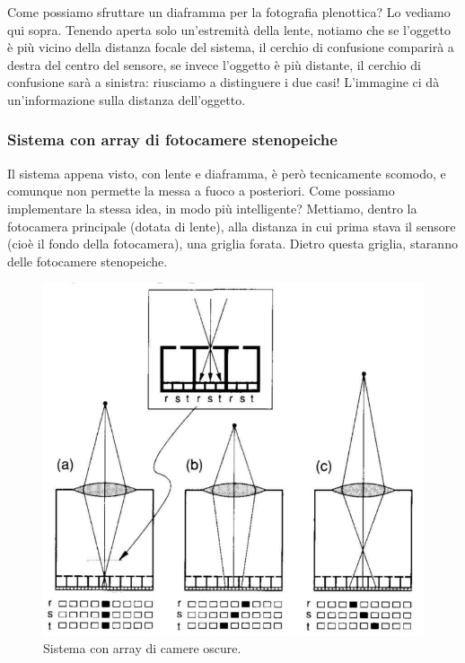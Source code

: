 \documentclass[a4paper,11pt]{article}
\begin{document}
Come possiamo sfruttare un diaframma per la fotografia plenottica? Lo vediamo qui sopra. Tenendo aperta solo un'estremità della lente, notiamo che se l'oggetto è più vicino
della distanza focale del sistema, il cerchio di confusione comparirà a destra del centro del sensore, se invece l'oggetto è più distante, il cerchio di confusione sarà a sinistra: riusciamo a
distinguere i due casi! L'immagine ci dà un'informazione sulla distanza dell'oggetto.

\subsubsection{Sistema con array di fotocamere stenopeiche}
Il sistema appena visto, con lente e diaframma, è però tecnicamente scomodo, e comunque non permette la messa a fuoco a posteriori. Come possiamo implementare la stessa idea, in modo più intelligente?
Mettiamo, dentro la fotocamera principale (dotata di lente), alla distanza in cui prima stava il sensore (cioè il fondo della fotocamera), una griglia forata.
Dietro questa griglia, staranno delle fotocamere stenopeiche.

\renewcommand{\thefigure}{3.25}
\begin{figure}[!h]
  \centering
    \includegraphics[scale=0.4]{images/3/pinhole_array.png}
    \caption{Sistema con array di camere oscure.}
\end{figure}
\end{document}
